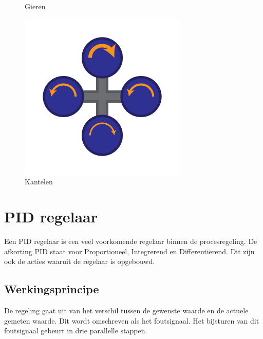 \begin{figure}[H]
\begin{minipage}[b]{0.3\textwidth}
					\caption[Gieren]{Gieren \newline \ }
					\label{quad_gieren}
				\end{minipage}
			\quad
				\begin{minipage}[b]{0.3\textwidth}
					\centering
					\includegraphics[height = 8cm, valign = b,width=\linewidth]{Vooronderzoek/quad_kantelen.png}
					\caption[Kantelen]{Kantelen \newline \ }
					\label{quad_kantelen}
				\end{minipage}
		\end{figure}

	\section{PID regelaar}

		\par Een PID regelaar is een veel voorkomende regelaar binnen de procesregeling. De afkorting PID staat voor Proportioneel, Integrerend en Differenti\"erend. Dit zijn ook de acties waaruit de regelaar is opgebouwd.

		\subsection{Werkingsprincipe}

			\par De regeling gaat uit van het verschil tussen de gewenste waarde en de actuele gemeten waarde. Dit wordt omschreven als het foutsignaal. Het bijsturen van dit foutsignaal gebeurt in drie parallelle stappen.

